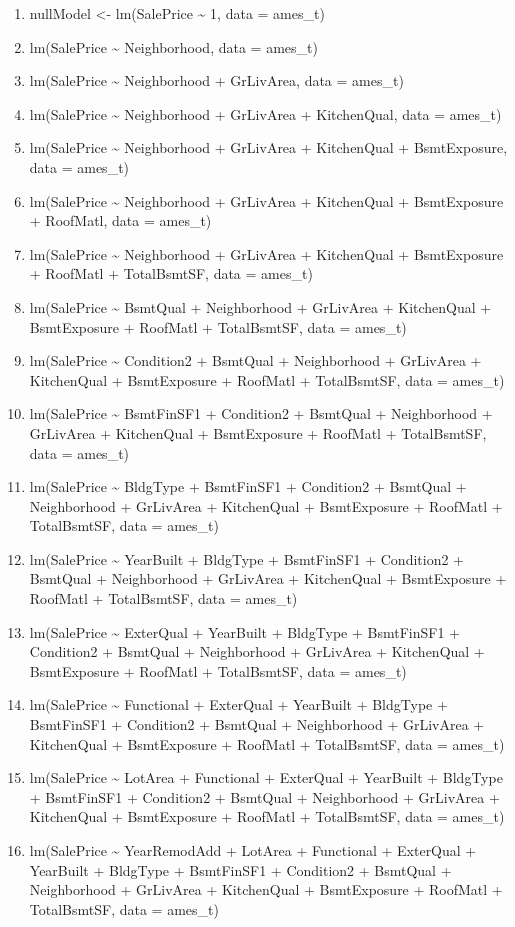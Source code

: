\documentclass[
]{article}
\providecommand{\tightlist}{%
  \setlength{\itemsep}{0pt}\setlength{\parskip}{0pt}}
\begin{document}
\begin{enumerate}
\def\labelenumi{\arabic{enumi}.}
\setcounter{enumi}{-1}
\tightlist
\item
  nullModel \textless- lm(SalePrice \textasciitilde{} 1, data = ames\_t)
\item
  lm(SalePrice \textasciitilde{} Neighborhood, data = ames\_t)
\item
  lm(SalePrice \textasciitilde{} Neighborhood + GrLivArea, data =
  ames\_t)
\item
  lm(SalePrice \textasciitilde{} Neighborhood + GrLivArea + KitchenQual,
  data = ames\_t)
\item
  lm(SalePrice \textasciitilde{} Neighborhood + GrLivArea + KitchenQual
  + BsmtExposure, data = ames\_t)
\item
  lm(SalePrice \textasciitilde{} Neighborhood + GrLivArea + KitchenQual
  + BsmtExposure + RoofMatl, data = ames\_t)
\item
  lm(SalePrice \textasciitilde{} Neighborhood + GrLivArea + KitchenQual
  + BsmtExposure + RoofMatl + TotalBsmtSF, data = ames\_t)
\item
  lm(SalePrice \textasciitilde{} BsmtQual + Neighborhood + GrLivArea +
  KitchenQual + BsmtExposure + RoofMatl + TotalBsmtSF, data = ames\_t)
\item
  lm(SalePrice \textasciitilde{} Condition2 + BsmtQual + Neighborhood +
  GrLivArea + KitchenQual + BsmtExposure + RoofMatl + TotalBsmtSF, data
  = ames\_t)
\item
  lm(SalePrice \textasciitilde{} BsmtFinSF1 + Condition2 + BsmtQual +
  Neighborhood + GrLivArea + KitchenQual + BsmtExposure + RoofMatl +
  TotalBsmtSF, data = ames\_t)
\item
  lm(SalePrice \textasciitilde{} BldgType + BsmtFinSF1 + Condition2 +
  BsmtQual + Neighborhood + GrLivArea + KitchenQual + BsmtExposure +
  RoofMatl + TotalBsmtSF, data = ames\_t)
\item
  lm(SalePrice \textasciitilde{} YearBuilt + BldgType + BsmtFinSF1 +
  Condition2 + BsmtQual + Neighborhood + GrLivArea + KitchenQual +
  BsmtExposure + RoofMatl + TotalBsmtSF, data = ames\_t)
\item
  lm(SalePrice \textasciitilde{} ExterQual + YearBuilt + BldgType +
  BsmtFinSF1 + Condition2 + BsmtQual + Neighborhood + GrLivArea +
  KitchenQual + BsmtExposure + RoofMatl + TotalBsmtSF, data = ames\_t)
\item
  lm(SalePrice \textasciitilde{} Functional + ExterQual + YearBuilt +
  BldgType + BsmtFinSF1 + Condition2 + BsmtQual + Neighborhood +
  GrLivArea + KitchenQual + BsmtExposure + RoofMatl + TotalBsmtSF, data
  = ames\_t)
\item
  lm(SalePrice \textasciitilde{} LotArea + Functional + ExterQual +
  YearBuilt + BldgType + BsmtFinSF1 + Condition2 + BsmtQual +
  Neighborhood + GrLivArea + KitchenQual + BsmtExposure + RoofMatl +
  TotalBsmtSF, data = ames\_t)
\item
  lm(SalePrice \textasciitilde{} YearRemodAdd + LotArea + Functional +
  ExterQual + YearBuilt + BldgType + BsmtFinSF1 + Condition2 + BsmtQual
  + Neighborhood + GrLivArea + KitchenQual + BsmtExposure + RoofMatl +
  TotalBsmtSF, data = ames\_t)
\end{enumerate}
\end{document}
